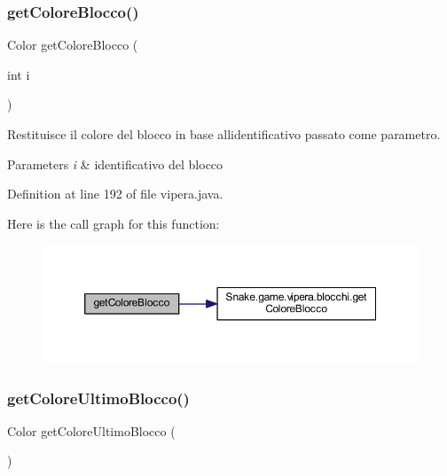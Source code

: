 \subsubsection{\texorpdfstring{get\+Colore\+Blocco()}{getColoreBlocco()}}
{\footnotesize\ttfamily Color get\+Colore\+Blocco (\begin{DoxyParamCaption}\item[{int}]{i }\end{DoxyParamCaption})}



Restituisce il colore del blocco in base all\textquotesingle{}identificativo passato come parametro. 


\begin{DoxyParams}{Parameters}
{\em i} & identificativo del blocco \\
\hline
\end{DoxyParams}


Definition at line 192 of file vipera.\+java.

Here is the call graph for this function\+:
\nopagebreak
\begin{figure}[H]
\begin{center}
\leavevmode
\includegraphics[width=350pt]{class_snake_1_1game_1_1vipera_1_1vipera_a6c5d6f8c561308ff9ec579b370a969e0_cgraph}
\end{center}
\end{figure}
\mbox{\label{class_snake_1_1game_1_1vipera_1_1vipera_a1afbc9b85396f53e6180eab2e5a36d4d}} 
\subsubsection{\texorpdfstring{get\+Colore\+Ultimo\+Blocco()}{getColoreUltimoBlocco()}}
{\footnotesize\ttfamily Color get\+Colore\+Ultimo\+Blocco (\begin{DoxyParamCaption}{ }\end{DoxyParamCaption})}



